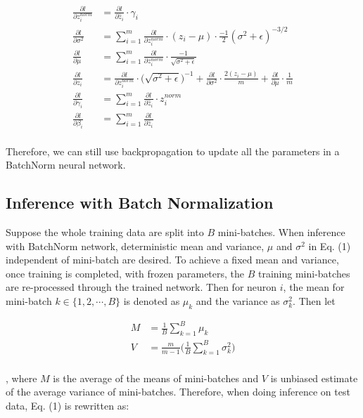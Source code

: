 \documentclass{article}
\begin{document}
\begin{align*}
   \frac{\partial l}{\partial z_i^{norm}} &= \frac{\partial l}{\partial \hat{z}_i}\cdot\gamma_i\\
   \frac{\partial l}{\partial \sigma^2}  &= \sum_{i=1}^m\frac{\partial l}{\partial z_i^{norm}}\cdot(z_i-\mu)\cdot\frac{-1}{2}(\sigma^2+\epsilon)^{-3/2} \\
   \frac{\partial l}{\partial \mu}  &= \sum_{i=1}^m\frac{\partial l}{\partial z_i^{norm}}\cdot \frac{-1}{\sqrt{\sigma^2+\epsilon}}\\
   \frac{\partial l}{\partial z_i}  &=  \frac{\partial l}{\partial z_i^{norm}} \cdot\bigg(\sqrt{\sigma^2+\epsilon}\bigg)^{-1} + \frac{\partial l}{\partial \sigma^2}\cdot\frac{2(z_i-\mu)}{m} +  \frac{\partial l}{\partial \mu}\cdot\frac{1}{m}\\
   \frac{\partial l}{\partial \gamma_i}  &=  \sum_{i=1}^m\frac{\partial l}{\partial \hat{z}_i}\cdot z_i^{norm} \\
   \frac{\partial l}{\partial \beta_i}  &= \sum_{i=1}^m\frac{\partial l}{\partial \hat{z}_i} \\
\end{align*}

Therefore, we can still use backpropagation to update all the parameters in a BatchNorm neural network.

\subsection{Inference with Batch Normalization}

Suppose the whole training data are split into $B$ mini-batches. When inference with BatchNorm network, deterministic mean and variance, $\mu$ and $\sigma^2$ in Eq. (1) independent of mini-batch are desired. To achieve a fixed mean and variance, once training is completed, with frozen parameters, the $B$ training mini-batches are re-processed through the trained network. Then for neuron $i$, the mean for mini-batch $k\in\{1,2,\cdots,B\}$ is denoted as $\mu_k$ and the variance as $\sigma^2_k$. Then let

\begin{align*}
   M &= \frac{1}{B}\sum_{k=1}^B\mu_k\\
   V &= \frac{m}{m-1}\Bigg(\frac{1}{B}\sum_{k=1}^B\sigma^2_k\Bigg)\\
\end{align*}

, where $M$ is the average of the means of mini-batches and $V$ is unbiased estimate of the average variance of mini-batches. Therefore, when doing inference on test data, Eq. (1) is rewritten as:
\end{document}
